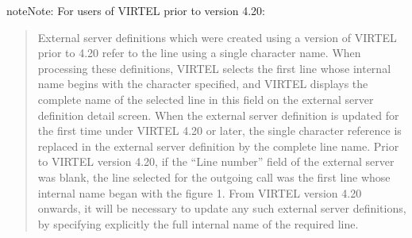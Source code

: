 \documentclass[letterpaper,10pt,english]{sphinxmanual}
\begin{document}
\begin{sphinxadmonition}{note}{Note:}
For users of VIRTEL prior to version 4.20:
\begin{quote}

External server definitions which were created using a version of VIRTEL prior to 4.20 refer to the line using a single character name. When processing these definitions, VIRTEL selects the first line whose internal name begins with the character specified, and VIRTEL displays the complete name of the selected line in this field on the external server definition detail screen. When the external server definition is updated for the first time under VIRTEL 4.20 or later, the single character reference is replaced in the external server definition by the complete line name. Prior to VIRTEL version 4.20, if the “Line number” field of the external server was blank, the line selected for the outgoing call was the first line whose internal name began with the figure 1. From VIRTEL version 4.20 onwards, it will be necessary to update any such external server definitions, by specifying explicitly the full internal name of the required line.
\end{quote}
\end{sphinxadmonition}
\end{document}

